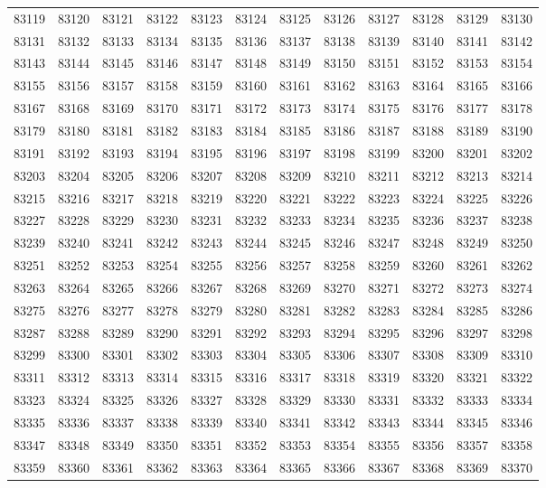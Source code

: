 \begin{center}
\begin{longtable}{llllllllllll}
83119 &83120 &83121 &83122 &83123 &83124 &83125 &83126 &83127 &83128 &83129 &83130 \\
83131 &83132 &83133 &83134 &83135 &83136 &83137 &83138 &83139 &83140 &83141 &83142 \\
83143 &83144 &83145 &83146 &83147 &83148 &83149 &83150 &83151 &83152 &83153 &83154 \\
83155 &83156 &83157 &83158 &83159 &83160 &83161 &83162 &83163 &83164 &83165 &83166 \\
83167 &83168 &83169 &83170 &83171 &83172 &83173 &83174 &83175 &83176 &83177 &83178 \\
83179 &83180 &83181 &83182 &83183 &83184 &83185 &83186 &83187 &83188 &83189 &83190 \\
83191 &83192 &83193 &83194 &83195 &83196 &83197 &83198 &83199 &83200 &83201 &83202 \\
83203 &83204 &83205 &83206 &83207 &83208 &83209 &83210 &83211 &83212 &83213 &83214 \\
83215 &83216 &83217 &83218 &83219 &83220 &83221 &83222 &83223 &83224 &83225 &83226 \\
83227 &83228 &83229 &83230 &83231 &83232 &83233 &83234 &83235 &83236 &83237 &83238 \\
83239 &83240 &83241 &83242 &83243 &83244 &83245 &83246 &83247 &83248 &83249 &83250 \\
83251 &83252 &83253 &83254 &83255 &83256 &83257 &83258 &83259 &83260 &83261 &83262 \\
83263 &83264 &83265 &83266 &83267 &83268 &83269 &83270 &83271 &83272 &83273 &83274 \\
83275 &83276 &83277 &83278 &83279 &83280 &83281 &83282 &83283 &83284 &83285 &83286 \\
83287 &83288 &83289 &83290 &83291 &83292 &83293 &83294 &83295 &83296 &83297 &83298 \\
83299 &83300 &83301 &83302 &83303 &83304 &83305 &83306 &83307 &83308 &83309 &83310 \\
83311 &83312 &83313 &83314 &83315 &83316 &83317 &83318 &83319 &83320 &83321 &83322 \\
83323 &83324 &83325 &83326 &83327 &83328 &83329 &83330 &83331 &83332 &83333 &83334 \\
83335 &83336 &83337 &83338 &83339 &83340 &83341 &83342 &83343 &83344 &83345 &83346 \\
83347 &83348 &83349 &83350 &83351 &83352 &83353 &83354 &83355 &83356 &83357 &83358 \\
83359 &83360 &83361 &83362 &83363 &83364 &83365 &83366 &83367 &83368 &83369 &83370 \\

\end{longtable}
\end{center}
